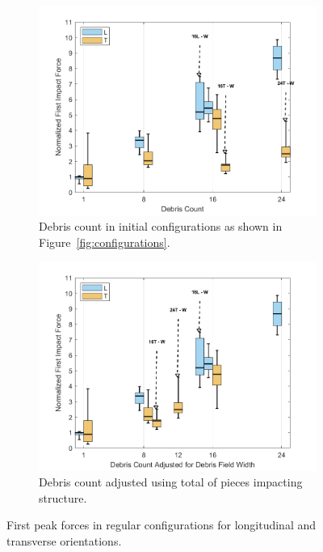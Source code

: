 \documentclass{article}
\begin{document}
{\begin{figure}[htbp]
    \centering
    \begin{subfigure}[t]{0.9\textwidth}
        \centering
        \includegraphics[width=\textwidth]{FirstPeak_Regular_SplitByTrial.png}
        \caption{Debris count in initial configurations as shown in Figure~\ref{fig:configurations}.}
        \label{fig:firstpeak_regular_original}
    \end{subfigure}
    \hfill
    \begin{subfigure}[t]{0.9\textwidth}
        \centering
        \includegraphics[width=\textwidth]{FirstPeak_Regular_RemappedT.png}
        \caption{Debris count adjusted using total of pieces impacting structure.}
        \label{fig:firstpeak_regular_remap}
    \end{subfigure}
    \caption{First peak forces in regular configurations for longitudinal and transverse orientations.}
    \label{fig:firstpeak_regular_split}
\end{figure}

}
\end{document}
